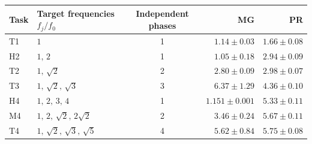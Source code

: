 \begin{tabular}{llcrr}
\toprule
Task & Target frequencies $f_j/f_0$ & Independent phases & MG & PR \\
\midrule
T1 & $1$ & 1 & $1.14 \pm 0.03$ & $1.66 \pm 0.08$ \\
H2 & $1,\,2$ & 1 & $1.05 \pm 0.18$ & $2.94 \pm 0.09$ \\
T2 & $1,\,\sqrt{2}$ & 2 & $2.80 \pm 0.09$ & $2.98 \pm 0.07$ \\
T3 & $1,\,\sqrt{2},\,\sqrt{3}$ & 3 & $6.37 \pm 1.29$ & $4.36 \pm 0.10$ \\
H4 & $1,\,2,\,3,\,4$ & 1 & $1.151 \pm 0.001$ & $5.33 \pm 0.11$ \\
M4 & $1,\,2,\,\sqrt{2},\,2\sqrt{2}$ & 2 & $3.46 \pm 0.24$ & $5.67 \pm 0.11$ \\
T4 & $1,\,\sqrt{2},\,\sqrt{3},\,\sqrt{5}$ & 4 & $5.62 \pm 0.84$ & $5.75 \pm 0.08$ \\
\bottomrule
\end{tabular}
